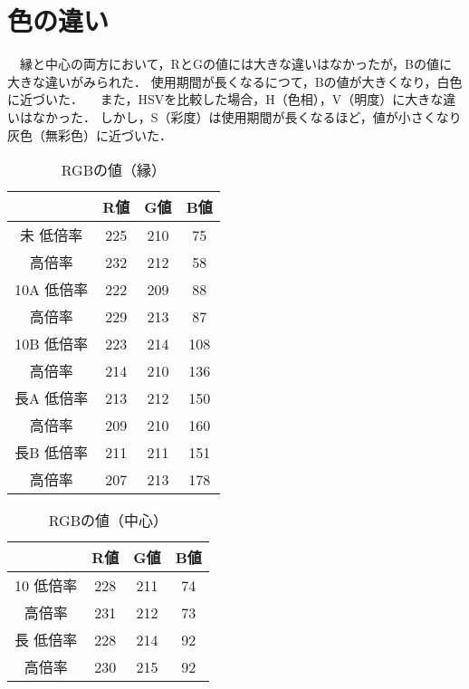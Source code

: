 \documentclass[main]{subfiles}
\begin{document}
\section{色の違い}

　縁と中心の両方において，RとGの値には大きな違いはなかったが，Bの値に大きな違いがみられた．
使用期間が長くなるにつて，Bの値が大きくなり，白色に近づいた．
　また，HSVを比較した場合，H（色相），V（明度）に大きな違いはなかった．
しかし，S（彩度）は使用期間が長くなるほど，値が小さくなり灰色（無彩色）に近づいた．


\begin{table}[h]
    \caption{RGBの値（縁）}
    \label{table:RGB1}
    \centering
\begin{tabular}{c|c|c|c}
    & R値 & G値 & B値 \\ \hline
   未 低倍率 & 225 & 210 & 75 \\ \hline
   高倍率 & 232 & 212 & 58 \\ \hline\hline
   10A 低倍率 & 222 & 209 & 88 \\ \hline
   高倍率 & 229 & 213 & 87 \\ \hline
   10B 低倍率 & 223 & 214 & 108 \\ \hline
   高倍率 & 214 & 210 & 136 \\ \hline\hline
   長A 低倍率 & 213 & 212 & 150 \\ \hline
   高倍率 & 209 & 210 & 160 \\ \hline
   長B 低倍率 & 211 & 211 & 151 \\ \hline
   高倍率 & 207 & 213 & 178 \\ \hline\hline
\end{tabular}    
\end{table}

\begin{table}[h]
    \caption{RGBの値（中心）}
    \label{table:RGB2}
    \centering
\begin{tabular}{c|c|c|c}
    & R値 & G値 & B値 \\ \hline
   10 低倍率 & 228 & 211 & 74 \\ \hline
   高倍率 & 231 & 212 & 73 \\ \hline\hline
   長 低倍率 & 228 & 214 & 92 \\ \hline
   高倍率 & 230 & 215 & 92 \\ 
\end{tabular}    
\end{table}
\end{document}
